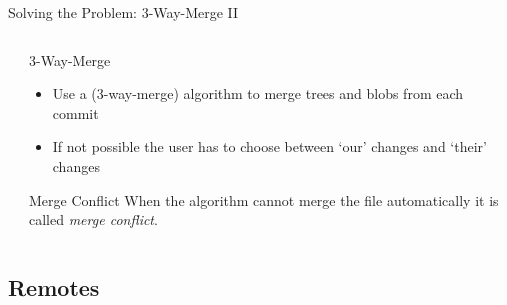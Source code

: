 \documentclass[xetex, handout]{beamer}
\begin{document}
\begin{frame}[fragile]{Solving the Problem: 3-Way-Merge II}
\begin{columns}
\begin{column}{.55\linewidth}
    \end{column}
    \begin{column}{.45\linewidth}
      \begin{alertblock}{3-Way-Merge}
        \begin{itemize}
          \item Use a (3-way-merge) algorithm to merge trees and blobs from
            each commit

          \item If not possible the user has to choose between `our' changes
            and `their' changes
        \end{itemize}
      \end{alertblock}
      \begin{block}{Merge Conflict}
        When the algorithm cannot merge the file automatically it is called
        \emph{merge conflict}.
      \end{block}
    \end{column}
  \end{columns}
\end{frame}

\subsection{Remotes}
\end{document}
